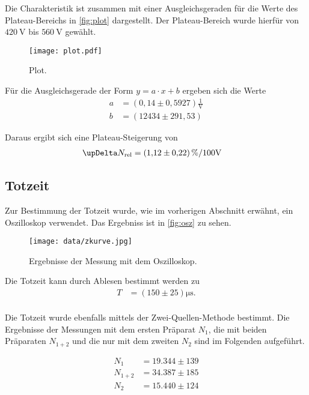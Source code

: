 Die Charakteristik ist zusammen mit einer Ausgleichsgeraden für die Werte des Plateau-Bereichs in \autoref{fig:plot} dargestellt. Der Plateau-Bereich wurde hierfür
von $\SI{420}{\volt}$ bis $\SI{560}{\volt}$ gewählt.

\begin{figure}[H]
  \centering
  \texttt{[image: plot.pdf]}
  \caption{Plot.}
  \label{fig:plot}
\end{figure}


Für die Ausgleichsgerade der Form $y = a \cdot x + b$ ergeben sich die Werte
\begin{align*}
  a &= (0,14 \pm 0,5927) \frac{1}{\si{\volt}} \\
  b &= (12434 \pm 291,53)
\end{align*}

Daraus ergibt sich eine Plateau-Steigerung von
\begin{align*}
  \upDelta N_\text{rel} &= \SI{1,12+-0,22}{\percent\per100\volt}
\end{align*}


\subsection{Totzeit}

Zur Bestimmung der Totzeit wurde, wie im vorherigen Abschnitt erwähnt, ein Oszilloskop verwendet. Das Ergebniss ist in \autoref{fig:osz} zu sehen.
\begin{figure}[H]
  \centering
  \texttt{[image: data/zkurve.jpg]}
  \caption{Ergebnisse der Messung mit dem Oszilloskop.}
  \label{fig:osz}
\end{figure}

Die Totzeit kann durch Ablesen bestimmt werden zu
\begin{align*}
  T &= (150 \pm 25) \si{\micro\second}. \\
\end{align*}

Die Totzeit wurde ebenfalls mittels der Zwei-Quellen-Methode bestimmt. Die Ergebnisse der Messungen mit dem ersten Präparat $N_1$, die mit beiden Präparaten
$N_{1+2}$ und die nur mit dem zweiten $N_2$ sind im Folgenden aufgeführt.

\begin{align*}
  N_1 &= 19.344 \pm 139 \\
  N_{1+2} &= 34.387 \pm 185 \\
  N_2 &= 15.440 \pm 124 \\
\end{align*}

